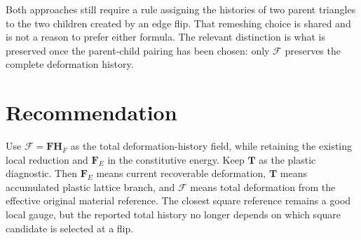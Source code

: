 \documentclass[10pt,a4paper]{article}
\newcommand{\Fm}{\boldsymbol{\mathcal F}}
\newcommand{\F}{\mathbf F}
\newcommand{\FE}{\mathbf F_{\!E}}
\newcommand{\HF}{\mathbf H_{\!F}}
\newcommand{\T}{\mathbf T}
\begin{document}
Both approaches still require a rule assigning the histories of two parent
triangles to the two children created by an edge flip.  That remeshing choice is
shared and is not a reason to prefer either formula.  The relevant distinction
is what is preserved once the parent-child pairing has been chosen: only
$\Fm$ preserves the complete deformation history.

\section{Recommendation}

Use $\Fm=\F\HF$ as the total deformation-history field, while retaining the
existing local reduction and $\FE$ in the constitutive energy.  Keep $\T$ as the
plastic diagnostic.  Then $\FE$ means current recoverable deformation, $\T$
means accumulated plastic lattice branch, and $\Fm$ means total deformation
from the effective original material reference.  The closest square reference
remains a good local gauge, but the reported total history no longer depends on
which square candidate is selected at a flip.
\end{document}
